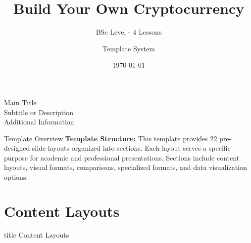\documentclass[8pt,aspectratio=169]{beamer}
\title{Build Your Own Cryptocurrency}
\subtitle{BSc Level - 4 Lessons}
\author{Template System}
\institute{Cryptocurrency Course}
\date{\today}
\begin{document}
\begin{frame}[plain]
\vspace{2cm}
\begin{center}
{\Huge Main Title}\\[0.5cm]
{\Large Subtitle or Description}\\[2cm]
{\normalsize Additional Information}
\end{center}
\end{frame}

\begin{frame}[plain]
\titlepage
\end{frame}

\begin{frame}[t]{Template Overview}
\tableofcontents
\vfill
\footnotesize
\textbf{Template Structure:} This template provides 22 pre-designed slide layouts organized into sections. Each layout serves a specific purpose for academic and professional presentations. Sections include content layouts, visual formats, comparisons, specialized formats, and data visualization options.
\end{frame}

\section{Content Layouts}

\begin{frame}[t]
\vfill
\centering
\begin{beamercolorbox}[sep=8pt,center]{title}
\Large Content Layouts\par
\end{beamercolorbox}
\vfill
\end{frame}
\end{document}
